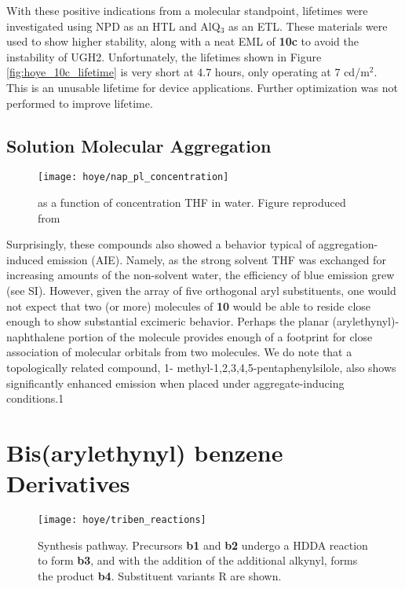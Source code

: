\documentclass[../thesis.tex]{subfiles}
\begin{document}
With these positive indications from a molecular standpoint, lifetimes were investigated using NPD as an HTL and AlQ$_3$ as an ETL.
These materials were used to show higher stability, along with a neat EML of \textbf{10c} to avoid the instability of UGH2.
Unfortunately, the lifetimes shown in Figure \ref{fig:hoye_10c_lifetime} is very short at 4.7 hours, only operating at 7 cd/m$^2$.
This is an unusable lifetime for device applications.
Further optimization was not performed to improve lifetime.

\subsection{Solution Molecular Aggregation}

\begin{wrapfigure}{r}{.5\textwidth}
\centering
\texttt{[image: hoye/nap\_pl\_concentration]}
\caption{\pl as a function of concentration THF in water.  Figure reproduced from \textcite{Xu2016}}
\label{fig:hoye_pl_concentration}
\end{wrapfigure}

Surprisingly, these compounds also showed a behavior typical of aggregation-induced emission (AIE). 
Namely, as the strong solvent THF was exchanged for increasing amounts of the non-solvent water, the efficiency of blue emission grew (see SI). 
However, given the array of five orthogonal aryl substituents, one would not expect that two (or more) molecules of \textbf{10} would be able to reside close enough to show substantial excimeric behavior. 
Perhaps the planar (arylethynyl)- naphthalene portion of the molecule provides enough of a footprint for close association of molecular orbitals from two molecules. 
We do note that a topologically related compound, 1- methyl-1,2,3,4,5-pentaphenylsilole, also shows significantly enhanced emission when placed under aggregate-inducing conditions.1

\section{Bis(arylethynyl) benzene Derivatives}\label{sec:hoye_triben}

\begin{wrapfigure}{r}{.5\textwidth}
\centering
\texttt{[image: hoye/triben\_reactions]}
\caption{Synthesis pathway. Precursors \textbf{b1} and \textbf{b2} undergo a HDDA reaction to form \textbf{b3}, and with the addition of the additional alkynyl, forms the product \textbf{b4}. Substituent variants R are shown.}
\label{fig:hoye_triben_reactions}
\end{wrapfigure}
\end{document}
